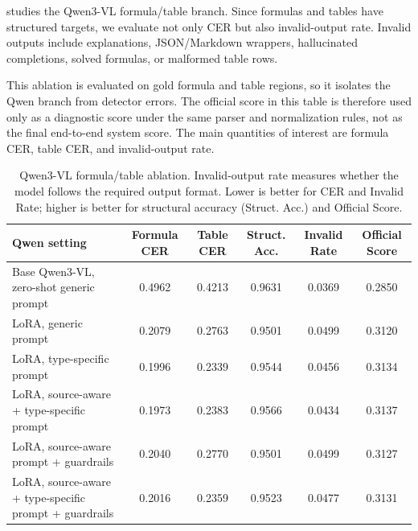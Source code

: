\documentclass[runningheads]{llncs}
\newcommand{\metrichead}[1]{#1}
\begin{document}
 studies the Qwen3-VL formula/table branch. Since formulas and tables have structured targets, we evaluate not only CER but also invalid-output rate. Invalid outputs include explanations, JSON/Markdown wrappers, hallucinated completions, solved formulas, or malformed table rows.

This ablation is evaluated on gold formula and table regions, so it isolates the Qwen branch from detector errors. The official score in this table is therefore used only as a diagnostic score under the same parser and normalization rules, not as the final end-to-end system score. The main quantities of interest are formula CER, table CER, and invalid-output rate.

\begin{table}[tb]
  \caption{Qwen3-VL formula/table ablation. Invalid-output rate measures whether the model follows the required output format. Lower is better for CER and Invalid Rate; higher is better for structural accuracy (Struct. Acc.) and Official Score.}
  \label{tab:qwen-ablation}
  \centering
  \begingroup
  \scriptsize
  \setlength{\tabcolsep}{3pt}
  \renewcommand{\arraystretch}{1.05}
  \begin{tabularx}{\linewidth}{@{}Yccccc@{}}
    \toprule
    Qwen setting & \metrichead{Formula CER} & \metrichead{Table CER} & \metrichead{Struct. Acc.} & \metrichead{Invalid Rate} & \metrichead{Official Score} \\
    \midrule
    Base Qwen3-VL, zero-shot generic prompt & 0.4962 & 0.4213 & 0.9631 & 0.0369 & 0.2850 \\
    LoRA, generic prompt & 0.2079 & 0.2763 & 0.9501 & 0.0499 & 0.3120 \\
    LoRA, type-specific prompt & 0.1996 & 0.2339 & 0.9544 & 0.0456 & 0.3134 \\
    LoRA, source-aware + type-specific prompt & 0.1973 & 0.2383 & 0.9566 & 0.0434 & 0.3137 \\
    LoRA, source-aware prompt + guardrails & 0.2040 & 0.2770 & 0.9501 & 0.0499 & 0.3127 \\
    LoRA, source-aware + type-specific prompt + guardrails & 0.2016 & 0.2359 & 0.9523 & 0.0477 & 0.3131 \\
    \bottomrule
  \end{tabularx}
  \endgroup
\end{table}
\end{document}
